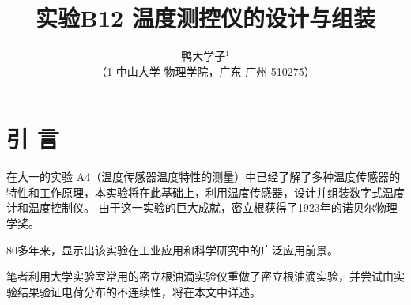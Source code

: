 \documentclass[10pt,a4paper,twocolumn,twoside,UTF8]{ctexart}
\begin{document}
\title{\LARGE\textbf 实验B12 温度测控仪的设计与组装}
\author{\large\kaishu 鸭大学子$^{1}$\\ \normalsize\kaishu（1 中山大学 物理学院，广东 广州 510275）}
\date{}%



\thispagestyle{firstpage}%
\pagestyle{maincontent}%



\section{引 \quad 言}
在大一的实验 A4（温度传感器温度特性的测量）\cite{shenhan2015}中已经了解了多种温度传感器的特性和工作原理，本实验将在此基础上，利用温度传感器，设计并组装数字式温度计和温度控制仪。
由于这一实验的巨大成就，密立根获得了1923年的诺贝尔物理学奖。\par
80多年来，显示出该实验在工业应用和科学研究中的广泛应用前景。\par
笔者利用大学实验室常用的密立根油滴实验仪重做了密立根油滴实验，并尝试由实验结果验证电荷分布的不连续性，将在本文中详述。
\end{document}

